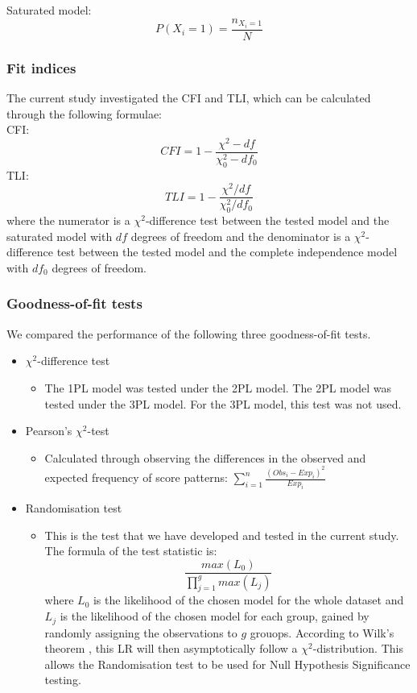\documentclass[Royal,sageapa,times,doublespace]{sagej}
\begin{document}
Saturated model:
\begin{equation}
P(X_i = 1) = \frac{n_{X_i = 1}}{N}
\end{equation}
\subsubsection{Fit indices} 
The current study investigated the CFI and TLI, which can be calculated through the following formulae: \\

CFI:
\begin{equation}
CFI = 1 - \frac{\chi^{2} - df}{\chi^{2}_{0} - df_0}
\end{equation}
TLI:
\begin{equation}
TLI = 1 - \frac{\chi^{2}/df}{\chi^{2}_{0}/df_0}
\end{equation}
where the numerator is a $\chi^2$-difference test between the tested model and the saturated model with $df$ degrees of freedom 
and the denominator is a $\chi^2$-difference test between the tested model and the complete independence model with $df_0$ degrees of freedom.

\subsubsection{Goodness-of-fit tests}

We compared the performance of the following three goodness-of-fit tests.
\begin{itemize}
\item{$\chi^2$-difference test}
	\begin{itemize}
	\item{The 1PL model was tested under the 2PL model. The 2PL model was tested under the 3PL model. For the 3PL model, this test was not used.}
	\end{itemize}
\item{Pearson's $\chi^2$-test}
	\begin{itemize}
	\item{Calculated through observing the differences in the observed and expected frequency of score patterns: $\sum_{i = 1}^{n}\frac{(Obs_i - Exp_i)^2}{Exp_i}$}
	\end{itemize}
\item{Randomisation test}
	\begin{itemize}
	\item{This is the test that we have developed and tested in the current study. The formula of the test statistic is:
	\begin{equation}
		\frac{max(L_0)}{\prod_{j = 1}^g max(L_j)}
	\end{equation} where $L_0$ is the likelihood of the chosen model for the whole dataset and $L_j$ is the likelihood of the chosen model for each group, gained by randomly assigning the observations to $g$ grouops. According to Wilk's theorem \cite{willkth}, this LR will then asymptotically follow a $\chi^2$-distribution. This allows the Randomisation test to be used for Null Hypothesis Significance testing.} 
	\end{itemize}
\end{itemize}
\end{document}
